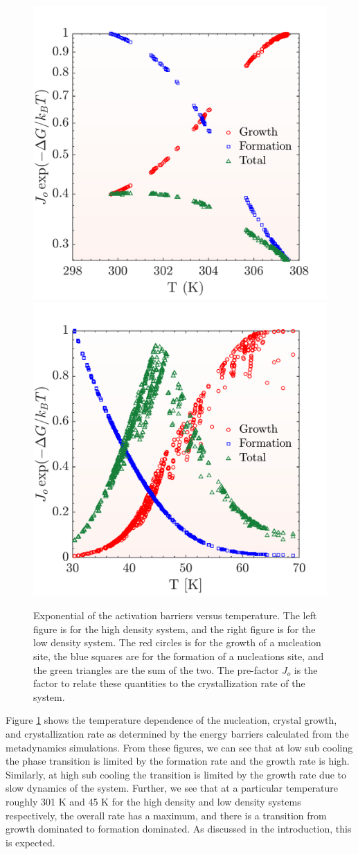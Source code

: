 \begin{figure}[h]
	\centering
	\includegraphics[width = .45\textwidth]{./Figures/Nucleation/high_density/trend.pdf}
	\hspace{.03\textwidth}
	\includegraphics[width = .45\textwidth]{./Figures/Nucleation/low_density/trend.pdf}
	\caption{Exponential of the activation barriers versus temperature.  The left figure is for the high density system, and the right figure is for the low density system.  The red circles is for the growth of a nucleation site, the blue squares are for the formation of a nucleations site, and the green triangles are the sum of the two.  The pre-factor $J_o$ is the factor to relate these quantities to the crystallization rate of the system.  }
	\label{rates}
\end{figure}

Figure \ref{rates} shows the temperature dependence of the nucleation, crystal growth, and crystallization rate as determined by the energy barriers calculated from the metadynamics simulations.  From these figures, we can see that at low sub cooling the phase transition is limited by the formation rate and the growth rate is high.  Similarly, at high sub cooling the transition is limited by the growth rate due to slow dynamics of the system.  Further, we see that at a particular temperature roughly 301 K and 45 K for the high density and low density systems respectively, the overall rate has a maximum, and there is a transition from growth dominated to formation dominated.  As discussed in the introduction, this is expected.  

